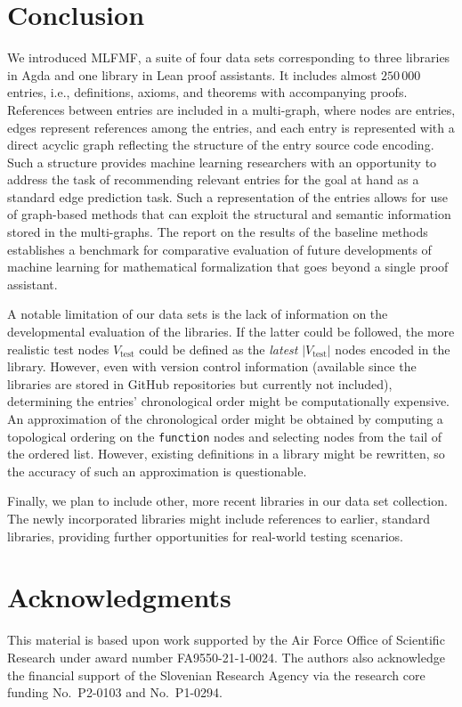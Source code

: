 \documentclass{article}
\begin{document}
\section{Conclusion}

We introduced MLFMF, a suite of four data sets corresponding to three libraries in Agda and one library in Lean proof assistants. It includes almost $250\,000$ entries, i.e., definitions, axioms, and theorems with accompanying proofs. References between entries are included in a multi-graph, where nodes are entries, edges represent references among the entries, and each entry is represented with a direct acyclic graph reflecting the structure of the entry source code encoding. Such a structure provides machine learning researchers with an opportunity to address the task of recommending relevant entries for the goal at hand as a standard edge prediction task. Such a representation of the entries allows for use of graph-based methods that can exploit the structural and semantic information stored in the multi-graphs. The report on the results of the baseline methods establishes a benchmark for comparative evaluation of future developments of machine learning for mathematical formalization that goes beyond a single proof assistant.

A notable limitation of our data sets is the lack of information on the developmental evaluation of the libraries. If the latter could be followed, the more realistic test nodes $V_\text{test}$ could be defined as the \emph{latest} $|V_\text{test}|$ nodes encoded in the library. However, even with version control information (available since the libraries are stored in GitHub repositories but currently not included), determining the entries’ chronological order might be computationally expensive. An approximation of the chronological order might be obtained by computing a topological ordering on the \texttt{function} nodes and selecting nodes from the tail of the ordered list. However, existing definitions in a library might be rewritten, so the accuracy of such an approximation is questionable.

Finally, we plan to include other, more recent libraries in our data set collection. The newly incorporated libraries might include references to earlier, standard libraries, providing further opportunities for real-world testing scenarios.

\section{Acknowledgments}

This material is based upon work supported by the Air Force Office of Scientific Research under award number FA9550-21-1-0024. The authors also acknowledge the financial support of the Slovenian Research Agency via the research core funding No.~P2-0103 and No.~P1-0294.



\end{document}
